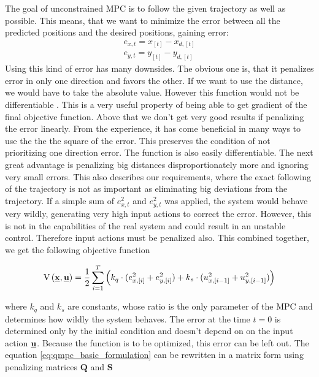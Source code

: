 \documentclass{article}
\newcommand{\uvec}{\textbf{\underline{u}}}
\begin{document}
The goal of unconstrained MPC is to follow the given trajectory as well as possible. This means, that we want to minimize the error between all the predicted positions and the desired positions, gaining error:
\begin{equation}
\begin{split}
\label{eq:simple_err}
e_{x, t} = x_{[t]} - x_{d, [t]}\\
e_{y, t} = y_{[t]} - y_{d, [t]}
\end{split}
\end{equation}
Using this kind of error has many downsides. The obvious one is, that it penalizes error in only one direction and favors the other. If we want to use the distance, we would have to take the absolute value. However this function would not be differentiable \cite{stein1970singular}. This is a very useful property of being able to get gradient of the final objective function. Above that we don't get very good results if penalizing the error linearly. From the experience, it has come beneficial in many ways to use the the the square of the error. This preserves the condition of not prioritizing one direction error. The function is also easily differentiable. The next great advantage is penalizing big distances disproportionately more and ignoring very small errors. This also describes our requirements, where the exact following of the trajectory is not as important as eliminating big deviations from the trajectory. If a simple sum of $e_{x, t}^2$ and $e_{y, t}^2$ was applied, the system would behave very wildly, generating very high input actions to correct the error. However, this is not in the capabilities of the real system and could result in an unstable control. Therefore input actions must be penalized also. This combined together, we get the following objective function 

\begin{equation}
\label{eq:qmpc_basic_formulation}
\mathrm{V}\left(\textbf{\underline{x}}, \uvec\right) 
= \frac{1}{2}\sum_{i=1}^{T}\left( k_q \cdot (e^2_{x, [i]}+e^2_{y, [i]}) + k_s \cdot (u^2_{x, [i-1]}+u^2_{y, [i-1]})\right)
\end{equation}

where $k_q$ and $k_s$ are constants, whose ratio is the only parameter of the MPC and determines how wildly the system behaves. The error at the time $t = 0$ is determined only by the initial condition and doesn't depend on on the input action $\uvec$. Because the function is to be optimized, this error can be left out. The equation \ref{eq:qmpc_basic_formulation} can be rewritten in a matrix form using penalizing matrices $\textbf{Q}$ and $\textbf{S}$
\end{document}

